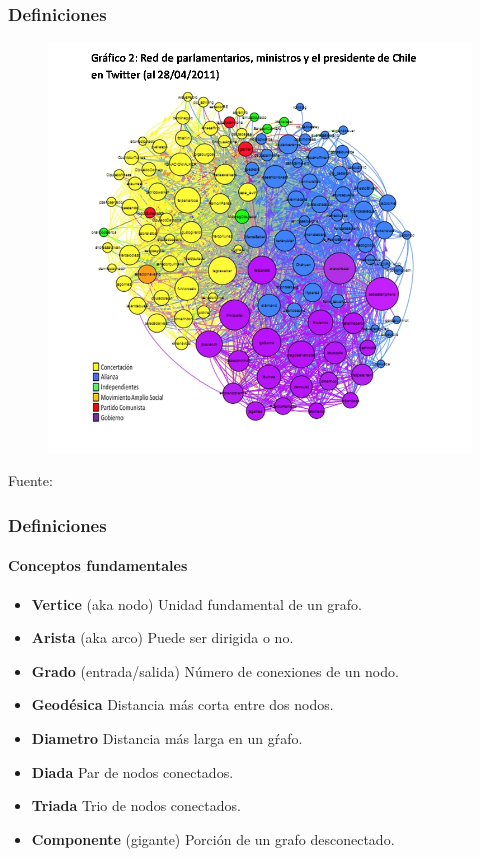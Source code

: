 \documentclass[10pt]{beamer}
\begin{document}
\begin{frame}
\frametitle{Definiciones}

\begin{figure}
\centering
\includegraphics[width=.6\linewidth]{../media/red_parlamentarios_ministros_en_twitter}
\end{figure}
{\footnotesize Fuente: \cite{fabrega2011}}

\end{frame}

\begin{frame}
\frametitle{Definiciones}
\framesubtitle{Conceptos fundamentales}

\begin{itemize}
\item {\bf Vertice} (aka nodo) Unidad fundamental de un grafo.
\item {\bf Arista} (aka arco) Puede ser dirigida o no.
\item {\bf Grado} (entrada/salida) N\'umero de conexiones de un nodo.
\item {\bf Geod\'esica} Distancia m\'as corta entre dos nodos.
\item {\bf Diametro} Distancia m\'as larga en un g\'rafo. 
\item {\bf Diada} Par de nodos conectados.
\item {\bf Triada} Trio de nodos conectados.
\item {\bf Componente} (gigante) Porci\'on de un grafo desconectado.
\end{itemize}
\end{frame}
\end{document}
